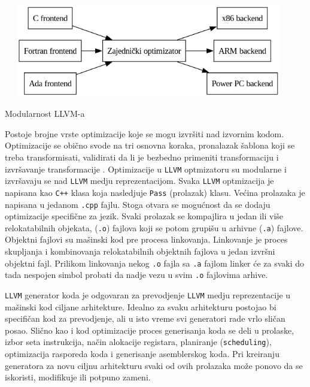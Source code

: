 \documentclass[11pt]{article}
\begin{document}
\begin{listing}[H]
\begin{center}
\includegraphics[width=5in, height=1.6in]{assets/images/modern_compiler_design.png}
\end{center}
\caption{Modularnost LLVM-a}
\label{lst:llvm_modular}
\end{listing}

Postoje brojne vrste optimizacije koje se mogu izvršiti nad izvornim kodom. Optimizacije se obično svode 
na tri osnovna koraka, pronalazak šablona koji se treba transformisati, validirati da li je bezbedno primeniti 
transformaciju i izvršavanje transformacije \cite{oss-architecture}. Optimizacije u \verb|LLVM| optmizatoru su modularne i izvršavaju 
se nad \verb|LLVM| medju reprezentacijom. Svaka \verb|LLVM| optmizacija je napisana kao \verb|C++| klasa koja 
nasledjuje \verb|Pass| (prolazak) klasu. Većina prolazaka je napisana u jedanom \verb|.cpp| fajlu.
Stoga otvara se mogućnost da se dodaju optimizacije specifične za jezik. Svaki prolazak se kompajlira u jedan 
ili više relokatabilnih objekata, (\verb|.o|) fajlova koji se potom grupišu u arhivne (\verb|.a|) fajlove. Objektni fajlovi 
su mašinski kod pre procesa linkovanja. Linkovanje je proces skupljanja i kombinovanja relokatabilnih objektnih fajlova
u jedan izvršni objektni fajl. Prilikom linkovanja nekog \verb|.o| fajla sa \verb|.a| fajlom linker će 
za svaki do tada nespojen simbol probati da nadje vezu u svim \verb|.o| fajlovima arhive.

\verb|LLVM| generator koda je odgovaran za prevodjenje \verb|LLVM| medju reprezentacije u mašinski kod ciljane 
arhitekture. Idealno za svaku arhitekturu postojao bi specifičan kod za prevodjenje, ali u isto vreme 
svi generatori rade vrlo sličan posao. Slično kao i kod optimizacije proces generisanja koda se deli u prolaske,
izbor seta instrukcija, način alokacije registara, planiranje (\verb|scheduling|), optimizacija rasporeda 
koda i generisanje asemblerskog koda. Pri kreiranju generatora za novu ciljnu arhitekturu svaki od ovih prolazaka
može ponovo da se iskoristi, modifikuje ili potpuno zameni.
\end{document}

